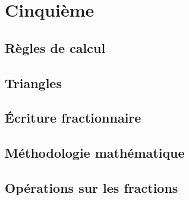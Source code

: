 \documentclass[a4paper,10pt]{book}
\begin{document}





\newpage




\tableofcontents

\newpage


\part{Cinquième}




\chapter{Règles de calcul}


\chapter{Triangles}


\chapter{Écriture fractionnaire}


\chapter{Méthodologie mathématique}


\chapter{Opérations sur les fractions}

\end{document}

